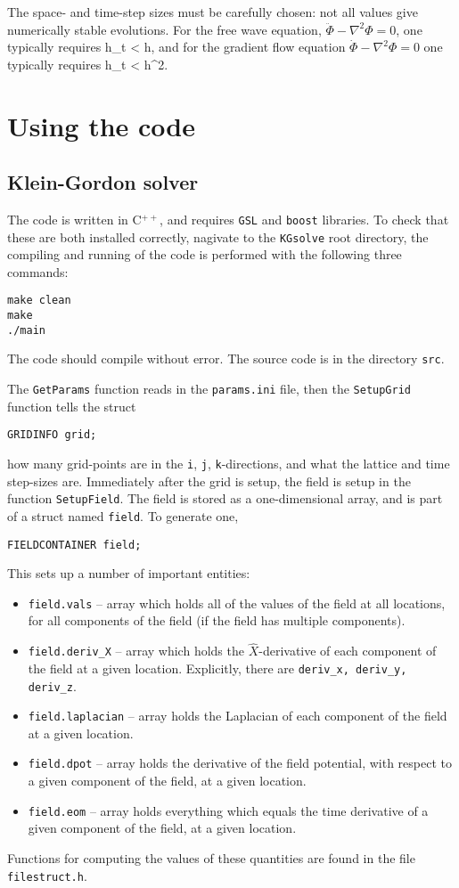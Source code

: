 \documentclass[amsmath,amssymb,12pt, eqsecnum]{revtex4}
\newcommand\codeRed[1]{\textcolor[rgb]{1,0,0}{{\tt #1}}}
\newcommand\codeBlue[1]{\textcolor[rgb]{0,0,1}{{\tt #1}}}
\begin{document}
The space- and time-step sizes must be carefully chosen: not all values give numerically stable evolutions. For the free wave equation, $\ddot{\Phi} - \nabla^2\Phi =0$, one typically requires
\bea
h_t < h,
\eea
and for the gradient flow equation $\dot{\Phi} - \nabla^2\Phi =0$ one typically requires
\bea
h_t < h^2.
\eea
\appendix
\section{Using the code}
\subsection{Klein-Gordon solver}
The code is written in C$^{++}$, and requires {\tt GSL} and {\tt boost} libraries. To check that these are both installed correctly, nagivate to the {\tt KGsolve} root directory, the compiling and running of the code is performed with the following three commands:
\begin{verbatim}
make clean
make
./main
\end{verbatim}
The code should compile without error. The source code is in the directory {\tt src}.

The \codeBlue{GetParams} function reads in the {\tt params.ini} file, then the \codeBlue{SetupGrid} function tells the struct
\begin{verbatim}
GRIDINFO grid;
\end{verbatim}
how many grid-points are in the {\tt i}, {\tt j}, {\tt k}-directions, and what the lattice and time step-sizes are. Immediately after the grid is setup, the field is setup in the function \codeBlue{SetupField}. The  field  is stored as a one-dimensional array, and is part of a struct named {\tt field}. To generate one, 
\begin{verbatim}
FIELDCONTAINER field;
\end{verbatim}
This sets up a number of important entities:
\begin{itemize}
\item {\tt field.vals} --    array which holds all of the values of the field at all locations, for all components of the field (if the field has multiple components). 
\item {\tt field.deriv\_X} --    array which holds the $\hat{X}$-derivative of each component of the field at a given location. Explicitly, there are {\tt deriv\_x, deriv\_y, deriv\_z}.
\item {\tt field.laplacian} --   array holds the Laplacian of each component of the field at a given location.
\item {\tt field.dpot} --   array holds the derivative of the field potential, with respect to a given component of the field, at a given location.
\item {\tt field.eom} --   array holds everything which equals the time derivative of a given component of the field, at a given location.
\end{itemize}
Functions for computing the values of these quantities are found in the file \codeRed{filestruct.h}.
\end{document}
